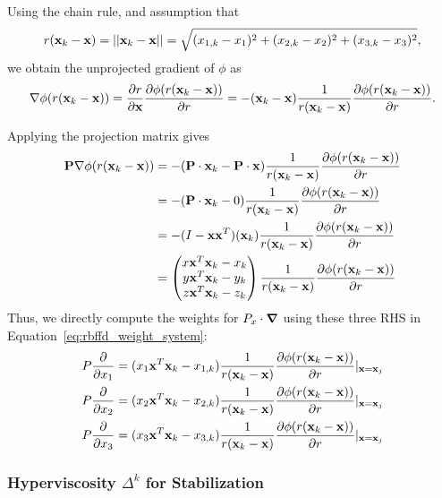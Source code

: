 \documentclass[11pt]{report}
\begin{document}
{Using the chain rule, and assumption that 
$$r(\vx_k-\vx)=\vectornorm{\vx_k-\vx} = \sqrt{(x_{1,k}-x_1)^2 + (x_{2,k}-x_2)^2 + (x_{3,k}-x_3)^2},$$
 we obtain the unprojected gradient of $\phi$ as
\begin{align*}
\nabla \phi(r(\vx_k - \vx)) = \pd{r}{\vx} \pd{\phi(r(\vx_k - \vx))}{r} = - (\vx_k - \vx)\frac{1}{r(\vx_k - \vx)} \pd{\phi(r(\vx_k - \vx))}{r} .
\end{align*} 

Applying the projection matrix gives 
\begin{align*}
\mathbf{P} \nabla \phi(r(\vx_k - \vx)) & = - (\mathbf{P} \cdot \vx_k - \mathbf{P}\cdot\vx)\frac{1}{r(\vx_k - \vx)} \pd{\phi(r(\vx_k - \vx))}{r} \\
& =  - (\mathbf{P}\cdot\vx_k - 0)\frac{1}{r(\vx_k - \vx)} \pd{\phi(r(\vx_k - \vx))}{r} \\
& = - (I-\vx\vx^T)(\vx_k
)\frac{1}{r(\vx_k - \vx)} \pd{\phi(r(\vx_k - \vx))}{r} \\
& = \begin{pmatrix} x \vx^T \vx_k - x_k \\ y \vx^T \vx_k -  y_k \\ z \vx^T \vx_k -z_k \end{pmatrix} \frac{1}{r(\vx_k - \vx)} \pd{\phi(r(\vx_k - \vx))}{r} 
 \end{align*}
Thus, we directly compute the weights for $P_{x}\cdot\grad{}$ using these three RHS in Equation~\ref{eq:rbffd_weight_system}: 
\begin{align*} 
P\pd{}{x_1} = ( x_1 \vx^T \vx_k - x_{1,k}) \frac{1}{r(\vx_k - \vx)} \pd{\phi(r(\vx_k - \vx))}{r} |_{\vx=\vx_j} \\
P\pd{}{x_2} = ( x_2 \vx^T \vx_k - x_{2,k}) \frac{1}{r(\vx_k - \vx)} \pd{\phi(r(\vx_k - \vx))}{r} |_{\vx=\vx_j} \\
P\pd{}{x_3} = ( x_3 \vx^T \vx_k - x_{3,k}) \frac{1}{r(\vx_k - \vx)} \pd{\phi(r(\vx_k - \vx))}{r} |_{\vx=\vx_j}
\end{align*}




\subsubsection{Hyperviscosity $\Delta^k$ for Stabilization}

}
\end{document}
